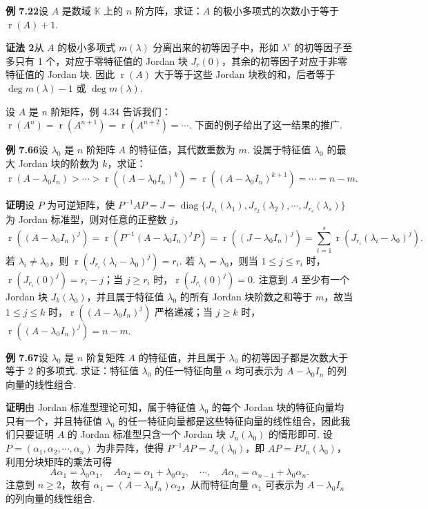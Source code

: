 \documentclass[UTF8, 12pt, fontset=fandol, oneside]{ctexart}
\begin{document}
\noindent\textbf{例 7.22}\quad 设 $A$ 是数域 $\mathbb{K}$ 上的 $n$ 阶方阵，求证：$A$ 的极小多项式的次数小于等于 $\operatorname{r}(A)+1$.

\noindent\textbf{证法 2}\quad 从 $A$ 的极小多项式 $m(\lambda)$ 分离出来的初等因子中，形如 $\lambda^r$ 的初等因子至多只有 1 个，对应于零特征值的 Jordan 块 $J_r(0)$，其余的初等因子对应于非零特征值的 Jordan 块. 因此 $\operatorname{r}(A)$ 大于等于这些 Jordan 块秩的和，后者等于 $\deg m(\lambda)-1$ 或 $\deg m(\lambda)$.

设 $A$ 是 $n$ 阶矩阵，例 4.34 告诉我们：$\operatorname{r}(A^n)=\operatorname{r}(A^{n+1})=\operatorname{r}(A^{n+2})=\cdots$. 下面的例子给出了这一结果的推广.

\noindent\textbf{例 7.66}\quad 设 $\lambda_0$ 是 $n$ 阶矩阵 $A$ 的特征值，其代数重数为 $m$. 设属于特征值 $\lambda_0$ 的最大 Jordan 块的阶数为 $k$，求证：
\[
\operatorname{r}(A-\lambda_0I_n)>\cdots>\operatorname{r}((A-\lambda_0I_n)^k)=\operatorname{r}((A-\lambda_0I_n)^{k+1})=\cdots=n-m.
\]

\noindent\textbf{证明}\quad 设 $P$ 为可逆矩阵，使 $P^{-1}AP=J=\operatorname{diag}\{J_{r_1}(\lambda_1),J_{r_2}(\lambda_2),\cdots,J_{r_s}(\lambda_s)\}$ 为 Jordan 标准型，则对任意的正整数 $j$，
\[
\operatorname{r}((A-\lambda_0I_n)^j)=\operatorname{r}(P^{-1}(A-\lambda_0I_n)^jP)=\operatorname{r}((J-\lambda_0I_n)^j)=\sum_{i=1}^s\operatorname{r}(J_{r_i}(\lambda_i-\lambda_0)^j).
\]
若 $\lambda_i\ne\lambda_0$，则 $\operatorname{r}(J_{r_i}(\lambda_i-\lambda_0)^j)=r_i$. 若 $\lambda_i=\lambda_0$，则当 $1\le j\le r_i$ 时，$\operatorname{r}(J_{r_i}(0)^j)=r_i-j$；当 $j\ge r_i$ 时，$\operatorname{r}(J_{r_i}(0)^j)=0$. 注意到 $A$ 至少有一个 Jordan 块 $J_k(\lambda_0)$，并且属于特征值 $\lambda_0$ 的所有 Jordan 块阶数之和等于 $m$，故当 $1\le j\le k$ 时，$\operatorname{r}((A-\lambda_0I_n)^j)$ 严格递减；当 $j\ge k$ 时，$\operatorname{r}((A-\lambda_0I_n)^j)=n-m$.

\noindent\textbf{例 7.67}\quad 设 $\lambda_0$ 是 $n$ 阶复矩阵 $A$ 的特征值，并且属于 $\lambda_0$ 的初等因子都是次数大于等于 2 的多项式. 求证：特征值 $\lambda_0$ 的任一特征向量 $\alpha$ 均可表示为 $A-\lambda_0I_n$ 的列向量的线性组合.

\noindent\textbf{证明}\quad 由 Jordan 标准型理论可知，属于特征值 $\lambda_0$ 的每个 Jordan 块的特征向量均只有一个，并且特征值 $\lambda_0$ 的任一特征向量都是这些特征向量的线性组合，因此我们只要证明 $A$ 的 Jordan 标准型只含一个 Jordan 块 $J_n(\lambda_0)$ 的情形即可. 设 $P=(\alpha_1,\alpha_2,\cdots,\alpha_n)$ 为非异阵，使得 $P^{-1}AP=J_n(\lambda_0)$，即 $AP=PJ_n(\lambda_0)$，利用分块矩阵的乘法可得
\[
A\alpha_1=\lambda_0\alpha_1,\quad A\alpha_2=\alpha_1+\lambda_0\alpha_2,\quad \cdots,\quad A\alpha_n=\alpha_{n-1}+\lambda_0\alpha_n.
\]
注意到 $n\ge2$，故有 $\alpha_1=(A-\lambda_0I_n)\alpha_2$，从而特征向量 $\alpha_1$ 可表示为 $A-\lambda_0I_n$ 的列向量的线性组合.
\end{document}
